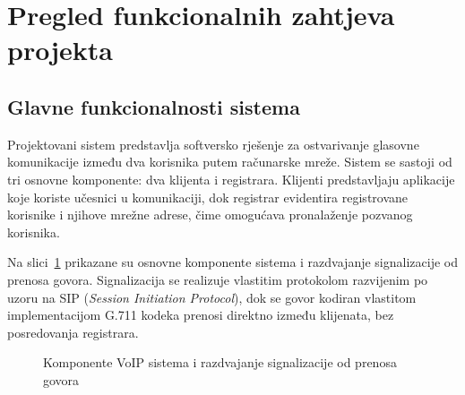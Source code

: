\section{Pregled funkcionalnih zahtjeva projekta}

\subsection{Glavne funkcionalnosti sistema}

Projektovani sistem predstavlja softversko rješenje za ostvarivanje glasovne komunikacije između dva korisnika putem računarske mreže. Sistem se sastoji od tri osnovne komponente: dva klijenta i registrara. Klijenti predstavljaju aplikacije koje koriste učesnici u komunikaciji, dok registrar evidentira registrovane korisnike i njihove mrežne adrese, čime omogućava pronalaženje pozvanog korisnika.

Na slici~\ref{fig:voip_komponente} prikazane su osnovne komponente sistema i razdvajanje signalizacije od prenosa govora. Signalizacija se realizuje vlastitim protokolom razvijenim po uzoru na SIP (\textit{Session Initiation Protocol}), dok se govor kodiran vlastitom implementacijom G.711 kodeka prenosi direktno između klijenata, bez posredovanja registrara.

\begin{figure}[htbp]
    \centering
    \caption{Komponente VoIP sistema i razdvajanje signalizacije od prenosa govora}
    \label{fig:voip_komponente}
\end{figure}

